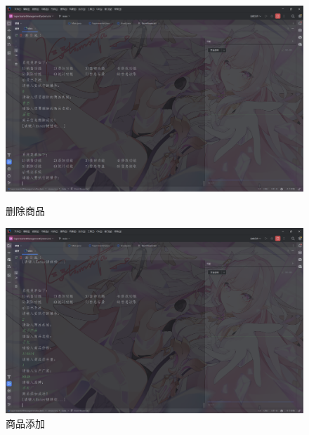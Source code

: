 \documentclass[12pt, a4paper, oneside]{ctexart}
\begin{document}
\begin{figure}[H]
    \begin{minipage}[t]{0.48\textwidth}
        \includegraphics[width=\textwidth]{../images/删除商品.png}
        \caption{删除商品}
    \end{minipage}
    \hfill
    \begin{minipage}[t]{0.48\textwidth}
        \includegraphics[width=\textwidth]{../images/商品添加.png}
        \caption{商品添加}
    \end{minipage}
\end{figure}
\end{document}
